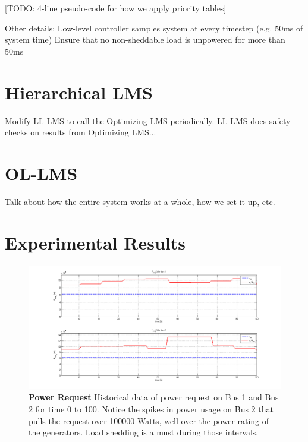 \documentclass{acm_proc_article-sp}
\begin{document}
[TODO: 4-line pseudo-code for how we apply priority tables]

Other details:
Low-level controller samples system at every  timestep (e.g. 50ms of system time) 
Ensure that no non-sheddable load is unpowered for more  than 50ms 

\section{Hierarchical LMS}
Modify LL-LMS to call the Optimizing LMS periodically.
LL-LMS does safety checks on results from Optimizing LMS...

\section{OL-LMS}
Talk about how the entire system works at a whole, how we set it up, etc.
\section{Experimental Results}
\begin{figure}[hb]
  \centering
  \includegraphics[width=0.9\columnwidth]{figures/preqnofail.png}
  \caption{\textbf{Power Request}
  Historical data of power request on Bus 1 and Bus 2 for time 0
  to 100. Notice the spikes in power usage on Bus 2 that pulls the
  request over 100000 Watts, well over the power rating of the generators.
  Load shedding is a must during those intervals.}
  \label{fig:preqnofail}
\end{figure}
\end{document}
